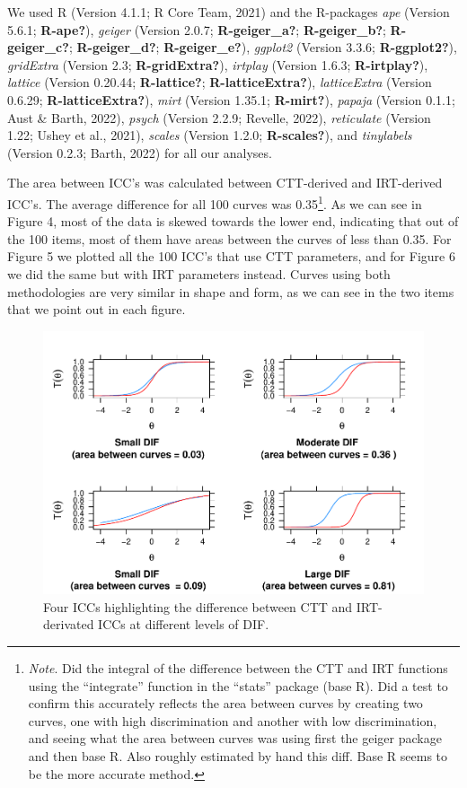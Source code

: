 \documentclass[
  man]{apa6}
\begin{document}
We used R (Version 4.1.1; R Core Team, 2021) and the R-packages \emph{ape} (Version 5.6.1; \textbf{R-ape?}), \emph{geiger} (Version 2.0.7; \textbf{R-geiger\_a?}; \textbf{R-geiger\_b?}; \textbf{R-geiger\_c?}; \textbf{R-geiger\_d?}; \textbf{R-geiger\_e?}), \emph{ggplot2} (Version 3.3.6; \textbf{R-ggplot2?}), \emph{gridExtra} (Version 2.3; \textbf{R-gridExtra?}), \emph{irtplay} (Version 1.6.3; \textbf{R-irtplay?}), \emph{lattice} (Version 0.20.44; \textbf{R-lattice?}; \textbf{R-latticeExtra?}), \emph{latticeExtra} (Version 0.6.29; \textbf{R-latticeExtra?}), \emph{mirt} (Version 1.35.1; \textbf{R-mirt?}), \emph{papaja} (Version 0.1.1; Aust \& Barth, 2022), \emph{psych} (Version 2.2.9; Revelle, 2022), \emph{reticulate} (Version 1.22; Ushey et al., 2021), \emph{scales} (Version 1.2.0; \textbf{R-scales?}), and \emph{tinylabels} (Version 0.2.3; Barth, 2022) for all our analyses.

The area between ICC's was calculated between CTT-derived and IRT-derived ICC's. The average difference for all 100 curves was 0.35\footnote{\emph{Note}. Did the integral of the difference between the CTT and IRT functions using the ``integrate'' function in the ``stats'' package (base R). Did a test to confirm this accurately reflects the area between curves by creating two curves, one with high discrimination and another with low discrimination, and seeing what the area between curves was using first the geiger package and then base R. Also roughly estimated by hand this diff. Base R seems to be the more accurate method.}. As we can see in Figure 4, most of the data is skewed towards the lower end, indicating that out of the 100 items, most of them have areas between the curves of less than 0.35.
For Figure 5 we plotted all the 100 ICC's that use CTT parameters, and for Figure 6 we did the same but with IRT parameters instead. Curves using both methodologies are very similar in shape and form, as we can see in the two items that we point out in each figure.

\begin{figure}
\centering
\includegraphics{SIOP_files/figure-latex/plotting-1.pdf}
\caption{\label{fig:plotting}Four ICCs highlighting the difference between CTT and IRT-derivated ICCs at different levels of DIF.}
\end{figure}
\end{document}
